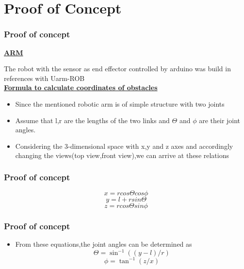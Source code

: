 \documentclass{beamer}
\begin{document}
\section{Proof of Concept}
\begin{frame}
\frametitle{Proof of concept}
\vspace{5mm}
\underline{ \textbf{ARM}}
\item The robot with the sensor as end effector controlled by  arduino was build in references with  Uarm-ROB \\
\vspace{5mm}
\underline{ \textbf{Formula to calculate coordinates of obstacles}}
\begin{itemize}
\item Since the mentioned robotic arm is of simple structure with two joints
\item Assume that l,r are the lengths of the two links and $\Theta$ and $\phi$ are their joint angles.
\item Considering the 3-dimensional space with x,y and z axes and accordingly changing the views(top view,front view),we can arrive at these relations
\end{itemize}
\end{frame}
\begin{frame}[fragile] %
\frametitle{Proof of concept}
 \begin{equation}
 x=rcos \Theta cos \phi
\end{equation}
\begin{equation}
y= l + rsin \Theta
\end{equation}
\begin{equation}
 z= rcos \Theta sin \phi
\end{equation}
\end{frame}

    
\begin{frame}[fragile] %
\frametitle{Proof of concept}

\begin{itemize}
\item From these equations,the joint angles can be determined as
\begin{equation}
\Theta = \sin^{-1} ((y-l)/r)
\end{equation}
\begin{equation}
\phi = \tan^{-1} (z/x)
\end{equation}
\end{itemize}


\end{frame}
\end{document}
